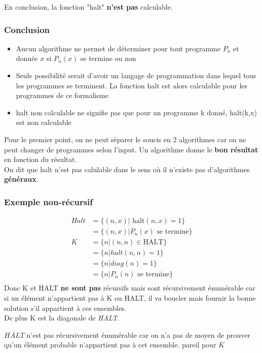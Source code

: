 \documentclass{report}
\begin{document}
En conclusion, la fonction "halt" \textbf{n'est pas} calculable.

\subsubsection{Conclusion}
\begin{itemize}
\item  Aucun algorithme ne permet de déterminer pour tout programme $P_n$ et donnée $x$ si $P_n(x)$ se termine ou non
\item Seule possibilité serait d’avoir un langage de programmation dans lequel tous les programmes se terminent. La fonction halt est alors calculable pour les programmes de ce formalisme
\item halt non calculable ne signifie pas que pour un programme k donné, halt(k,x) est
non calculable
\end{itemize}
Pour le premier point, on ne peut séparer le soucis en 2 algorithmes car on ne peut changer de programmes selon l'input. Un algorithme donne le \textbf{bon résultat} en fonction du résultat.\\

On dit que halt n'est pas calulable dans le sens où il n'existe pas d'algorithmes \textbf{généraux}.

\subsubsection{Exemple non-récursif}

\begin{align*}
Halt &= \{(n,x) | \text{ halt}(n,x) = 1\}\\
&= \{(n,x) | P_n (x) \text{ se termine}\}\\
K &= \{n | (n,n) \in \text{HALT}\}\\
&= \{n | halt(n,n) = 1\}\\
&= \{n | diag(n) = 1\}\\
&= \{n | P_n(n) \text{ se termine}\}\\
\end{align*}
Donc K et HALT \textbf{ne sont pas} récursifs mais sont récursivement énumérable car si un élément n'appartient pas à K ou HALT, il va boucler mais fournir la bonne solution s'il appartient à ces ensembles.\\
De plus K est la diagonale de \textit{HALT}.

$\overline{HALT}$ n'est pas récursivement énumérable car on n'a pas de moyen de prouver qu'un élément probable n'appartient pas à cet ensemble. pareil pour $\overline{K}$
\end{document}
